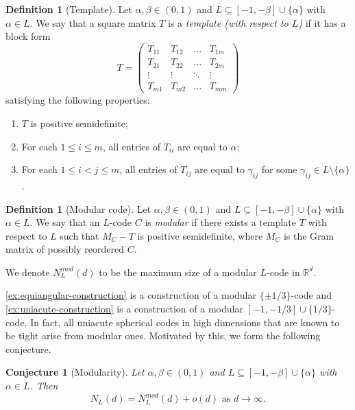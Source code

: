 \documentclass[reqno, 11pt]{amsart}
\newtheorem{conjecture}[theorem]{Conjecture}
\theoremstyle{definition}
\newtheorem{definition}[theorem]{Definition}
\theoremstyle{remark}
\newcommand{\RR}{\mathbb{R}}
\begin{document}
\begin{definition}[Template]\label{def:template}
Let $\alpha, \beta \in (0,1)$ and $L \subseteq [-1,-\beta]\cup\{\alpha\}$ with $\alpha \in L$. We say that a square matrix $T$ is a \textit{template (with respect to $L$)} if it has a block form
	\[
		T = \begin{pmatrix}
    T_{11} & T_{12} & \dots & T_{1m} \\
    T_{21} & T_{22} & \dots & T_{2m} \\
    \vdots & \vdots & \ddots & \vdots \\
    T_{m1} & T_{m 2} & \dots & T_{mm}
		\end{pmatrix}
	\]
	satisfying the following properties:
	\begin{enumerate}[label=(\roman*)]
		\item $T$ is positive semidefinite;
		\item For each $1 \leq i \leq m$, all entries of $T_{ii}$ are equal to $\alpha$;
		\item For each $1 \leq i < j \leq m$, all entries of $T_{ij}$ are equal to $\gamma_{ij}$ for some $\gamma_{ij} \in L \setminus \{\alpha\}$.
	\end{enumerate}
\end{definition}

\begin{definition}[Modular code]\label{def:modular}
Let $\alpha, \beta \in (0,1)$ and $L \subseteq [-1,-\beta]\cup\{\alpha\}$ with $\alpha \in L$.
	We say that an $L$-code $C$ is \textit{modular} if there exists a template $T$ with respect to $L$ such that $M_C - T$ is positive semidefinite, where $M_C$ is the Gram matrix of possibly reordered $C$. 

 We denote $N_L^{mod}(d)$ to be the maximum size of a modular $L$-code in $\RR^d$.
\end{definition}

\cref{ex:equiangular-construction} is a construction of a modular $\{\pm 1/3\}$-code and \cref{ex:uniacute-construction} is a construction of a modular $[-1,-1/3]\cup\{1/3\}$-code. In fact, all uniacute spherical codes in high dimensions that are known to be tight arise from modular ones. Motivated by this, we form the following conjecture. 



\begin{conjecture}[Modularity]\label{conj:modularity}
Let $\alpha,\beta \in (0,1)$ and $L \subseteq [-1,-\beta]\cup\{\alpha\}$ with $\alpha \in L$. Then
\[
		N_L(d) = N_L^{mod}(d) + o(d) \text{ as } d \to \infty.
\]
\end{conjecture}
\end{document}
